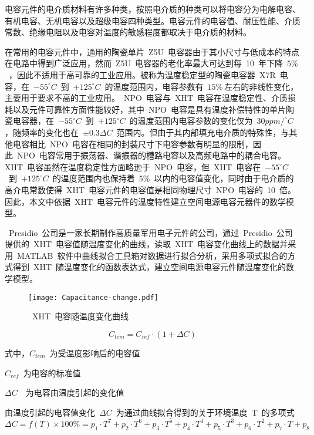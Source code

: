 电容元件的电介质材料有许多种类，按照电介质的种类可以将电容分为电解电容、有机电容、无机电容以及超级电容四种类型。电容元件的电容值、耐压性能、介质常数、绝缘电阻以及电容对温度的敏感程度都取决于电介质的材料。

在常用的电容元件中，通用的陶瓷单片~Z5U~电容器由于其小尺寸与低成本的特点在电路中得到广泛应用，然而~Z5U~电容器的老化率最大可达到每~10~年下降~$5\%$~，因此不适用于高可靠的工业应用。被称为温度稳定型的陶瓷电容器~X7R~电容，在~$-55^{\circ}C$~到~$+125^{\circ}C$~的温度范围内，电容参数有~$15\%~$左右的非线性变化，主要用于要求不高的工业应用。~NPO~电容与~XHT~电容在温度稳定性、介质损耗以及元件可靠性方面性能较好，其中~NPO~电容是具有温度补偿特性的单片陶瓷电容器，在~$-55^{\circ}C$~到~$+125^{\circ}C$~的温度范围内电容参数的变化仅为~$30ppm/^{\circ}C$，随频率的变化也在~$\pm0.3\Delta C$~范围内\cite{Rito2013Communications}。但由于其内部填充电介质的特殊性，与其他电容相比~NPO~电容在相同的封装尺寸下电容参数有明显的限制，因此~NPO~电容常用于振荡器、谐振器的槽路电容以及高频电路中的耦合电容。XHT~电容虽然在温度稳定性方面略逊于~NPO~电容，但~XHT~电容在~$-55^{\circ}C$~到~$+125^{\circ}C$~的温度范围内也保持着~$5\%$~以内的电容值变化，同时由于电介质的高介电常数使得~XHT~电容元件的电容值是相同物理尺寸~NPO~电容的~10~倍。因此，本文中依据~XHT~电容元件的温度特性建立空间电源电容元器件的数学模型。

~Presidio~公司是一家长期制作高质量军用电子元件的公司，通过~Presidio~公司提供的~XHT~电容值随温度变化的曲线\cite{Presidio2016Electrical}，读取~XHT~电容变化曲线上的数据并采用~MATLAB~软件中曲线拟合工具箱对数据进行拟合分析，采用多项式拟合的方式得到~XHT~随温度变化的函数表达式，建立空间电源电容元件随温度变化的数学模型。
\begin{figure}[h]
  \centering
     \texttt{[image: Capacitance-change.pdf]}\\
   \caption{~XHT~电容随温度变化曲线}\label{fig:chap2:capacitance-change}
\end{figure}
\begin{equation}\label{equ:chap2:Index2}
  C_{tem}=C_{ref}\cdot\left(1+\Delta C\right)
\end{equation}

式中，$C_{tem}$~为受温度影响后的电容值

\hspace{1.3cm}$C_{ref}$~为电容的标准值

\hspace{1.3cm}$\Delta C$~~为电容由温度引起的变化值

由温度引起的电容值变化~$\Delta C$~为通过曲线拟合得到的关于环境温度~T~的多项式
\begin{equation}\label{equ:chap2:Index3}
  \Delta C=f\left(T\right)\times 100\%=p_1\cdot T^7+p_2\cdot T^6+p_3\cdot T^5+p_4\cdot T^4+p_5\cdot T^3+p_6\cdot T^2+p_7\cdot T+p_8
\end{equation}

